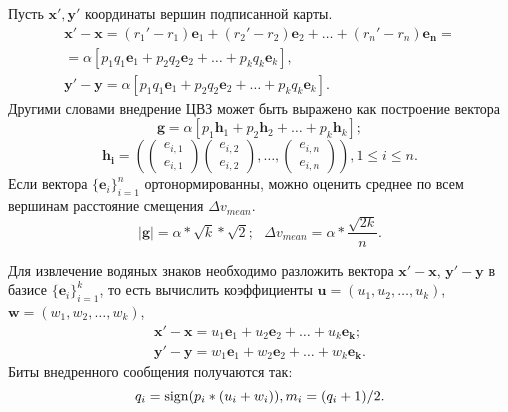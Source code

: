 Пусть $\mathbf{x'}, \mathbf{y'}$ координаты вершин подписанной карты. 
\begin{eqnarray*}
  \mathbf{x'} - \mathbf{x} = (r_1' - r_1) \mathbf{e}_1 + (r_2' - r_2) \mathbf{e}_2 + \dots + (r_n' - r_n) \mathbf{e_n} = \\
  = \alpha \left[ p_1 q_1 \mathbf{e}_1 + p_2 q_2 \mathbf{e}_2 + \dots + p_k q_k \mathbf{e}_k \right], \\
  \mathbf{y'} - \mathbf{y} = \alpha \left[ p_1 q_1 \mathbf{e}_1 + p_2 q_2 \mathbf{e}_2 + \dots + p_k q_k \mathbf{e}_k \right]. 
\end{eqnarray*}
Другими словами внедрение ЦВЗ может быть выражено как построение вектора  
\begin{equation}
\label{formula:g}
 \mathbf{g} = \alpha \left[ p_1 \mathbf{h}_1 + p_2 \mathbf{h}_2 + \dots + p_k \mathbf{h}_k \right]; 
\end{equation}
$$ \mathbf{h_i} = \left( \begin{pmatrix} e_{i, 1} \\ e_{i, 1} \end{pmatrix} 
\begin{pmatrix} e_{i, 2} \\ e_{i, 2} \end{pmatrix}, \dots, \begin{pmatrix} e_{i, n} \\e_{i, n}  \end{pmatrix} 
\right), 1 \le i \le n. $$
Если вектора $\{\mathbf{e}_i\}_{i=1}^n$ ортонормированны, можно оценить среднее по всем вершинам расстояние 
смещения $\Delta v_{mean}$.
\begin{equation}
\label{formula:mean_displacement}
|\mathbf{g}| = \alpha * \sqrt {k} * \sqrt{2}; \mbox{      } \Delta v_{mean} = \alpha * \frac{\sqrt{2k}}{n}. 
\end{equation}

Для извлечение водяных знаков необходимо разложить вектора $\mathbf{x'} - \mathbf{x}$, 
$\mathbf{y'} - \mathbf{y}$ в базисе $\{\mathbf{e}_i\}_{i=1}^k$, то есть вычислить коэффициенты 
$\mathbf{u} = (u_1, u_2, \dots, u_k)$, $\mathbf{w} = (w_1, w_2, \dots, w_k)$, 
\begin{eqnarray*}
  \mathbf{x'} - \mathbf{x} = u_1 \mathbf{e}_1 + u_2 \mathbf{e}_2 + \dots + u_k \mathbf{e_k}; \\ 
  \mathbf{y'} - \mathbf{y} = w_1 \mathbf{e}_1 + w_2 \mathbf{e}_2 + \dots + w_k \mathbf{e_k}.  
\end{eqnarray*}
Биты внедренного сообщения получаются так:
$$q_i = \operatorname{sign}(p_i * (u_i + w_i)), m_i = (q_i + 1) / 2.$$
